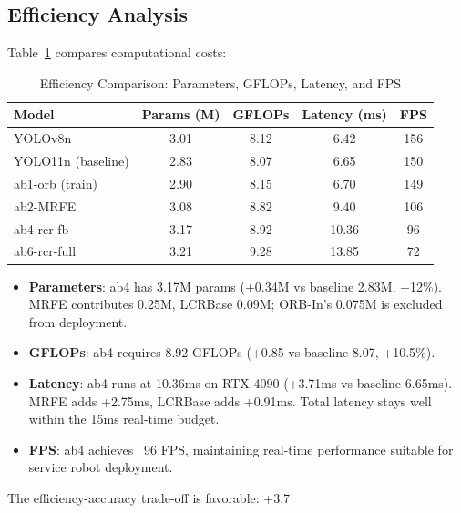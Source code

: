 \documentclass[journal]{IEEEtran}
\begin{document}
\subsection{Efficiency Analysis}

Table~\ref{tab:efficiency} compares computational costs:

\begin{table}[t]
\caption{Efficiency Comparison: Parameters, GFLOPs, Latency, and FPS}
\label{tab:efficiency}
\centering
\footnotesize
\setlength{\tabcolsep}{3pt}
\begin{tabular}{lcccc}
\toprule
\textbf{Model} & \textbf{Params (M)} & \textbf{GFLOPs} & \textbf{Latency (ms)} & \textbf{FPS} \\
\midrule
YOLOv8n & 3.01 & 8.12 & 6.42 & 156 \\
YOLO11n (baseline) & 2.83 & 8.07 & 6.65 & 150 \\
ab1-orb (train) & 2.90 & 8.15 & 6.70 & 149 \\
ab2-MRFE & 3.08 & 8.82 & 9.40 & 106 \\
ab4-rcr-fb & 3.17 & 8.92 & 10.36 & 96 \\
ab6-rcr-full & 3.21 & 9.28 & 13.85 & 72 \\
\bottomrule
\end{tabular}
\end{table}

\begin{itemize}
    \item \textbf{Parameters}: ab4 has 3.17M params (+0.34M vs baseline 2.83M, +12\%). MRFE contributes 0.25M, LCRBase 0.09M; ORB-In's 0.075M is excluded from deployment.

    \item \textbf{GFLOPs}: ab4 requires 8.92 GFLOPs (+0.85 vs baseline 8.07, +10.5\%).

    \item \textbf{Latency}: ab4 runs at 10.36ms on RTX 4090 (+3.71ms vs baseline 6.65ms). MRFE adds +2.75ms, LCRBase adds +0.91ms. Total latency stays well within the 15ms real-time budget.

    \item \textbf{FPS}: ab4 achieves ~96 FPS, maintaining real-time performance suitable for service robot deployment.
\end{itemize}

The efficiency-accuracy trade-off is favorable: +3.7%
\end{document}
